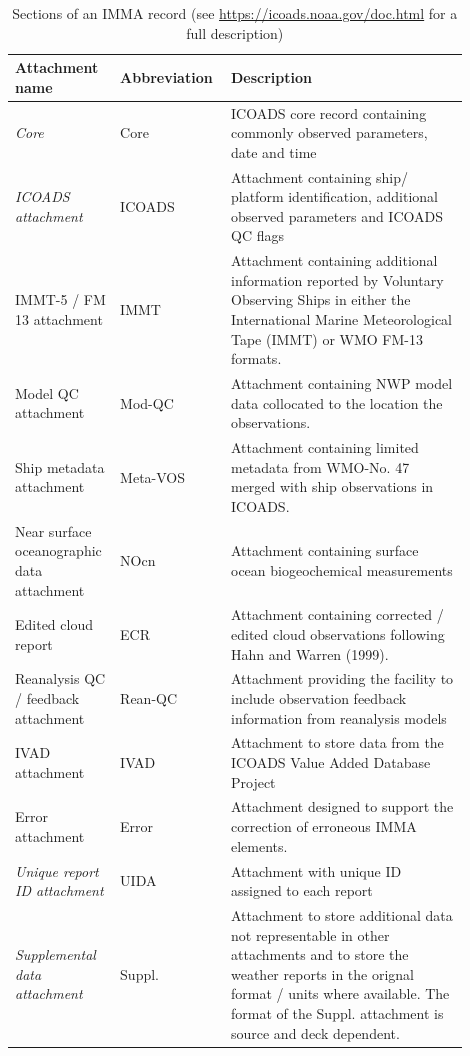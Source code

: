 \begin{table}
\centering
\caption{Sections of an IMMA record (see \url{https://icoads.noaa.gov/doc.html} for a full description)}
\label{tab:imma_structure}
\begin{tabular}{|p{0.2\linewidth}|p{0.2\linewidth}|p{0.5\linewidth}|}
\hline
\bfseries Attachment name & \bfseries Abbreviation & \bfseries Description \\
\hline
\it Core & Core & ICOADS core record containing commonly observed parameters, date and time\\\hline
\it ICOADS attachment & ICOADS & Attachment containing ship/ platform identification, additional observed parameters and ICOADS QC flags \\\hline
IMMT-5 / FM 13 attachment & IMMT & Attachment containing additional information reported by Voluntary Observing Ships in either the International Marine Meteorological Tape (IMMT) or WMO FM-13 formats. \\\hline
Model QC attachment & Mod-QC & Attachment containing NWP model data collocated to the location the observations. \\\hline
Ship metadata attachment & Meta-VOS & Attachment containing limited metadata from WMO-No. 47 merged with ship observations in ICOADS. \\\hline
Near surface oceanographic data attachment & NOcn & Attachment containing surface ocean biogeochemical measurements \\\hline
Edited cloud report & ECR & Attachment containing corrected / edited cloud observations following Hahn and Warren (1999). \\\hline
Reanalysis QC / feedback attachment & Rean-QC & Attachment providing the facility to include observation feedback information from reanalysis models \\\hline
IVAD attachment & IVAD & Attachment to store data from the ICOADS Value Added Database Project \\\hline
Error attachment & Error & Attachment designed to support the correction of erroneous IMMA elements. \\\hline
\it Unique report ID attachment & UIDA & Attachment with unique ID assigned to each report \\\hline
\it Supplemental data attachment & Suppl. & Attachment to store additional data not representable in other attachments and to store the weather reports in the orignal format / units where available. The format of the Suppl. attachment is source and deck dependent.\\\hline
\end{tabular}
\end{table}

